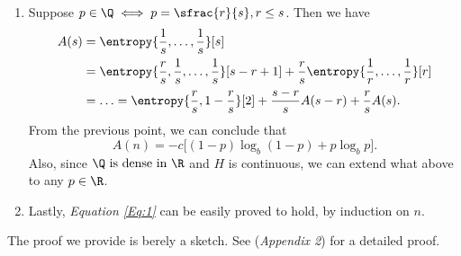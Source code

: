 \documentclass{subfiles}
\begin{document}
\begin{proof*}
\begin{enumerate}
            \item Suppose \(p \in \Q \iff p = \sfrac{r}{s}, r \le s\).
                Then we have 
                \[\begin{aligned}
                    A(s) & = \entropy{\frac{1}{s}, \ldots, \frac{1}{s}}[s] \\ 
                        & = \entropy{\frac{r}{s}, \frac{1}{s}, \ldots, \frac{1}{s}}[s - r + 1]
                          + \frac{r}{s} \entropy{\frac{1}{r}, \ldots, \frac{1}{r}}[r] \\ 
                        & = \ldots = \entropy{\frac{r}{s}, 1 - \frac{r}{s}}[2]
                          + \frac{s - r}{s} A(s - r) + \frac{r}{s} A(s).
                \end{aligned}\]
                From the previous point, we can conclude that 
                \[
                    A(n) = -c \lbrack
                        (1 - p) \log_{b} (1 - p) + p \log_{b} p
                    \rbrack.
                \]
                Also, since \(\Q \text{ is dense in } \R\) and \(H\) is continuous,
                we can extend what above to any \(p \in \R\).

            \item Lastly, \emph{Equation \eqref{Eq:1}} can be easily proved to hold,
                by induction on \(n\).

        \end{enumerate}
    \end{proof*}
    The proof we provide is berely a sketch.
    See \cite{shannon1948} (\emph{Appendix 2}) for a detailed proof.
\end{document}
